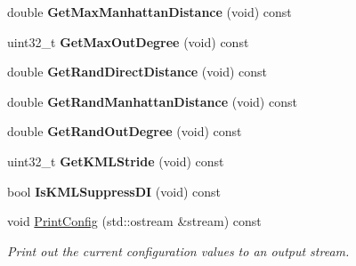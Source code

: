 \begin{DoxyCompactItemize}
\item 
double {\bfseries Get\+Max\+Manhattan\+Distance} (void) const \hypertarget{classconfig_1_1Config_a921f72ddd3fa6ac460be68710166689d}{}\label{classconfig_1_1Config_a921f72ddd3fa6ac460be68710166689d}

\item 
uint32\+\_\+t {\bfseries Get\+Max\+Out\+Degree} (void) const \hypertarget{classconfig_1_1Config_a3f65efb00726a3767d7a5e0e092aef8e}{}\label{classconfig_1_1Config_a3f65efb00726a3767d7a5e0e092aef8e}

\item 
double {\bfseries Get\+Rand\+Direct\+Distance} (void) const \hypertarget{classconfig_1_1Config_a29e7b8f6418430fe4f3cd7ca7cb3785c}{}\label{classconfig_1_1Config_a29e7b8f6418430fe4f3cd7ca7cb3785c}

\item 
double {\bfseries Get\+Rand\+Manhattan\+Distance} (void) const \hypertarget{classconfig_1_1Config_af618303530d95464311611858d4eaba3}{}\label{classconfig_1_1Config_af618303530d95464311611858d4eaba3}

\item 
double {\bfseries Get\+Rand\+Out\+Degree} (void) const \hypertarget{classconfig_1_1Config_abf1b0d278be8c5dbdf4d057287beba43}{}\label{classconfig_1_1Config_abf1b0d278be8c5dbdf4d057287beba43}

\item 
uint32\+\_\+t {\bfseries Get\+K\+M\+L\+Stride} (void) const \hypertarget{classconfig_1_1Config_afd78a60817a2a69acf60fecc222de4df}{}\label{classconfig_1_1Config_afd78a60817a2a69acf60fecc222de4df}

\item 
bool {\bfseries Is\+K\+M\+L\+Suppress\+DI} (void) const \hypertarget{classconfig_1_1Config_a0ffcad004a04a8674822fe3dfdf874fe}{}\label{classconfig_1_1Config_a0ffcad004a04a8674822fe3dfdf874fe}

\item 
void \hyperlink{classconfig_1_1Config_a7cc381b60daa2176a1b7f0d67f0c7a8d}{Print\+Config} (std\+::ostream \&stream) const 
\begin{DoxyCompactList}\small\item\em Print out the current configuration values to an output stream. \end{DoxyCompactList}\end{DoxyCompactItemize}
